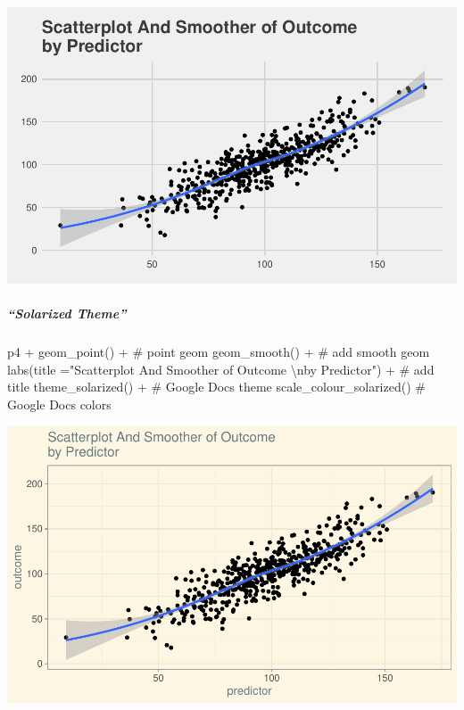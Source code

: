 \documentclass[12pt,]{article}
\newenvironment{Shaded}{}{}
\newcommand{\CharTok}[1]{\textcolor[rgb]{0.00,0.50,0.50}{#1}}
\newcommand{\CommentTok}[1]{\textcolor[rgb]{0.00,0.50,0.00}{#1}}
\newcommand{\DataTypeTok}[1]{#1}
\newcommand{\KeywordTok}[1]{\textcolor[rgb]{0.00,0.00,1.00}{#1}}
\newcommand{\NormalTok}[1]{#1}
\newcommand{\OperatorTok}[1]{#1}
\newcommand{\StringTok}[1]{\textcolor[rgb]{0.00,0.50,0.50}{#1}}
\let\oldsubparagraph\subparagraph
\renewcommand{\subparagraph}[1]{\oldsubparagraph{#1}\mbox{}}
\begin{document}
\includegraphics{introduction-to-ggplot2_files/figure-latex/unnamed-chunk-26-1.pdf}

\hypertarget{solarized-theme}{%
\subparagraph{``Solarized Theme''}\label{solarized-theme}}

\begin{Shaded}
\begin{Highlighting}[]
\NormalTok{p4 }\OperatorTok{+}\StringTok{ }
\StringTok{  }\KeywordTok{geom_point}\NormalTok{() }\OperatorTok{+}\StringTok{ }\CommentTok{# point geom}
\StringTok{  }\KeywordTok{geom_smooth}\NormalTok{() }\OperatorTok{+}\StringTok{ }\CommentTok{# add smooth geom}
\StringTok{  }\KeywordTok{labs}\NormalTok{(}\DataTypeTok{title =}\StringTok{"Scatterplot And Smoother of Outcome }\CharTok{\textbackslash{}n}\StringTok{by Predictor"}\NormalTok{) }\OperatorTok{+}\StringTok{ }\CommentTok{# add title}
\StringTok{  }\KeywordTok{theme_solarized}\NormalTok{() }\OperatorTok{+}\StringTok{ }\CommentTok{# Google Docs theme}
\StringTok{  }\KeywordTok{scale_colour_solarized}\NormalTok{() }\CommentTok{# Google Docs colors}
\end{Highlighting}
\end{Shaded}

\includegraphics{introduction-to-ggplot2_files/figure-latex/unnamed-chunk-27-1.pdf}
\end{document}
